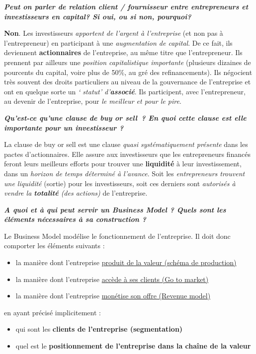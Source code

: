 \documentclass[12pt,oneside,a4paper]{article}
\begin{document}
\textbf{\emph{Peut on parler de relation client / fournisseur entre entrepreneurs et investisseurs en capital? Si oui, ou si non, pourquoi?}}

\textbf{Non}. Les investisseurs \emph{apportent de l’argent à l’entreprise} (et non pas à l’entrepreneur) en participant à une \emph{augmentation de capital}. De ce fait, ils deviennent \textbf{actionnaires} de l’entreprise, au même titre que l’entrepreneur. Ils prennent par ailleurs une \emph{position capitalistique importante} (plusieurs dizaines de pourcents du capital, voire plus de 50$ \%$, au gré des refinancements). Ils négocient très souvent des droits particuliers au niveau de la gouvernance de l’entreprise et ont en quelque sorte un\emph{ `	statut' d’\textbf{associé}}. Ils participent, avec l’entrepreneur, au devenir de l’entreprise, pour \emph{le meilleur et pour le pire}.


\textbf{\emph{Qu’est-ce qu’une clause de buy or sell ? En quoi cette clause est elle importante pour un investisseur ?}}

La clause de buy or sell est une clause \emph{quasi systématiquement présente} dans les pactes d’actionnaires. Elle assure aux investisseurs que les entrepreneurs financés feront leurs meilleurs efforts pour trouver une \textbf{liquidité} à leur investissement, dans un \emph{horizon de temps déterminé à l’avance}. Soit les \emph{entrepreneurs trouvent une liquidité} (sortie) pour les investisseurs, soit ces derniers sont \emph{autorisés à vendre la \textbf{totalité} (des actions)} de l’entreprise.

\textbf{\emph{A quoi et à qui peut servir un Business Model ? Quels sont les éléments nécessaires à sa construction ? }}

Le Business Model modélise le fonctionnement de l’entreprise. Il doit donc comporter les éléments suivants :

\begin{itemize}[label=]
\item la manière dont l’entreprise \underline{produit de la valeur (schéma de production)}
\item la manière dont l’entreprise \underline{accède à ses clients (Go to market)}
\item la manière dont l’entreprise \underline{monétise son offre (Revenue model)}
\end{itemize}

en ayant précisé implicitement :

\begin{itemize}[label=]
\item qui sont les \textbf{clients de l’entreprise (segmentation)}
\item quel est le \textbf{positionnement de l’entreprise dans la chaîne de la valeur}
\end{itemize}
\end{document}
